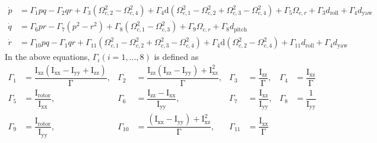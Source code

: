 \documentclass[3p]{elsarticle}
\begin{document}
\begin{align}
    \dot{p} &= \Gamma_1 pq - \Gamma_2 qr + \Gamma_3 (\Omega_{c, 2}^2 - \Omega_{c, 4}^2) + \Gamma_4 \mathrm{d} (\Omega_{c, 1}^2 - \Omega_{c, 2}^2 + \Omega_{c, 3}^2 - \Omega_{c, 4}^2) + \Gamma_5 \Omega_{c, r} + \Gamma_3 d_{\text{roll}} + \Gamma_4 d_{\text{yaw}} \\
    \dot{q} &= \Gamma_6 pr - \Gamma_7 (p^2 - r^2) + \Gamma_8 (\Omega_{c, 1}^2 - \Omega_{c, 3}^2) + \Gamma_9 \Omega_{c, r} + \Gamma_8 d_{\text{pitch}} \\
    \dot{r} &= \Gamma_{10} pq - \Gamma_{1} qr + \Gamma_{11} (\Omega_{c, 1}^2 - \Omega_{c, 2}^2 + \Omega_{c, 3}^2 - \Omega_{c, 4}^2) + \Gamma_{4} \mathrm{d} (\Omega_{c, 2}^2 - \Omega_{c, 4}^2) + \Gamma_{11} d_{\text{roll}} + \Gamma_{4} d_{\text{yaw}}
\end{align}
In the above equations, $\Gamma_i (i = 1, \ldots, 8)$ is defined as
\begin{equation}
    \begin{aligned}
        \Gamma_1 &= \dfrac{\mathrm{I}_{\text{xz}}\left(\mathrm{I}_{\text{xx}} - \mathrm{I}_{\text{yy}} + \mathrm{I}_{\text{zz}}\right)}{\mathrm{\Gamma}}, & \Gamma_2 &= \dfrac{\mathrm{I}_{\text{zz}}\left(\mathrm{I}_{\text{zz}} - \mathrm{I}_{\text{yy}}\right)+\mathrm{I}_{\text{xz}}^2}{\mathrm{\Gamma}}, & \Gamma_3 &= \dfrac{\mathrm{I}_{\text{zz}}}{\mathrm{\Gamma}}, & \Gamma_4 &= \dfrac{\mathrm{I}_{\text{xz}}}{\mathrm{\Gamma}} \\
        \Gamma_5 &= \dfrac{\mathrm{I}_{\text{rotor}}}{\mathrm{I}_{\text{xx}}}, & \Gamma_6 &= \dfrac{\mathrm{I}_{\text{zz}}-\mathrm{I}_{\text{xx}}}{\mathrm{I}_{\text{yy}}}, & \Gamma_7 &= \dfrac{\mathrm{I}_{\text{xz}}}{\mathrm{I}_{\text{yy}}}, & \Gamma_8 &= \dfrac{1}{\mathrm{I}_{\text{yy}}} \\
        \Gamma_9 &= \dfrac{\mathrm{I}_{\text{rotor}}}{\mathrm{I}_{\text{yy}}}, & \Gamma_{10} &= \dfrac{\left(\mathrm{I}_{\text{xx}}-\mathrm{I}_{\text{yy}}\right)+\mathrm{I}_{\text{xz}}^2}{\mathrm{\Gamma}}, & \Gamma_{11} &= \dfrac{\mathrm{I}_{\text{xx}}}{\mathrm{\Gamma}} & &
    \end{aligned}
\end{equation}
\end{document}

